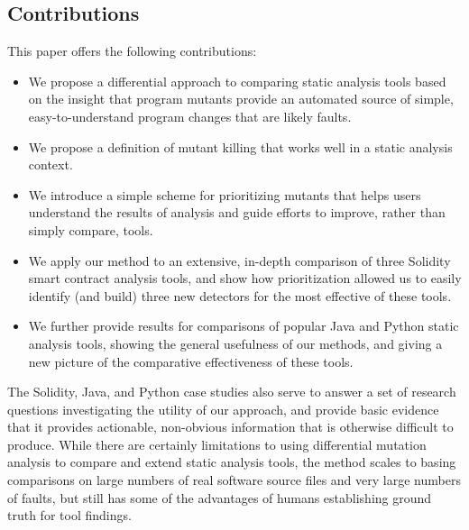 \subsection{Contributions}

This paper offers the following contributions:

\begin{itemize}
\item We propose a differential approach to comparing static analysis tools based on the insight that program mutants provide an automated source of simple, easy-to-understand program changes that are likely faults.
\item We propose a definition of mutant killing that works well in a static analysis context.
\item We introduce a simple scheme for prioritizing mutants that helps users understand the results of analysis and guide efforts to improve, rather than simply compare, tools.
\item We apply our method to an extensive, in-depth comparison of three Solidity smart contract analysis tools, and show how prioritization allowed us to easily identify (and build) three new detectors for the most effective of these tools.
\item We further provide results for comparisons of popular Java and Python static analysis tools, showing the general usefulness of our methods, and giving a new picture of the comparative effectiveness of these tools.
\end{itemize}

The Solidity, Java, and Python case studies also serve to answer a set of research questions investigating the utility of our approach, and provide basic evidence that it provides actionable, non-obvious information that is otherwise difficult to produce.  While there are certainly limitations to using differential mutation analysis to compare and extend static analysis tools, the method scales to basing comparisons on large numbers of real software source files and very large numbers of faults, but still has some of the advantages of humans establishing ground truth for tool findings.